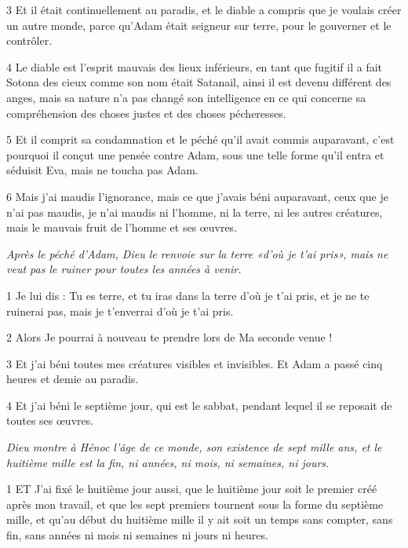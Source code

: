 \par 3 Et il était continuellement au paradis, et le diable a compris que je voulais créer un autre monde, parce qu'Adam était seigneur sur terre, pour le gouverner et le contrôler.

\par 4 Le diable est l'esprit mauvais des lieux inférieurs, en tant que fugitif il a fait Sotona des cieux comme son nom était Satanail, ainsi il est devenu différent des anges, mais sa nature n'a pas changé son intelligence en ce qui concerne sa compréhension des choses justes et des choses pécheresses.

\par 5 Et il comprit sa condamnation et le péché qu'il avait commis auparavant, c'est pourquoi il conçut une pensée contre Adam, sous une telle forme qu'il entra et séduisit Eva, mais ne toucha pas Adam.

\par 6 Mais j'ai maudis l'ignorance, mais ce que j'avais béni auparavant, ceux que je n'ai pas maudis, je n'ai maudis ni l'homme, ni la terre, ni les autres créatures, mais le mauvais fruit de l'homme et ses œuvres.


\par \textit{Après le péché d'Adam, Dieu le renvoie sur la terre «d'où je t'ai pris», mais ne veut pas le ruiner pour toutes les années à venir.}

\par 1 Je lui dis : Tu es terre, et tu iras dans la terre d'où je t'ai pris, et je ne te ruinerai pas, mais je t'enverrai d'où je t'ai pris.

\par 2 Alors Je pourrai à nouveau te prendre lors de Ma seconde venue !

\par 3 Et j'ai béni toutes mes créatures visibles et invisibles. Et Adam a passé cinq heures et demie au paradis.

\par 4 Et j'ai béni le septième jour, qui est le sabbat, pendant lequel il se reposait de toutes ses œuvres.


\par \textit{Dieu montre à Hénoc l'âge de ce monde, son existence de sept mille ans, et le huitième mille est la fin, ni années, ni mois, ni semaines, ni jours.}

\par 1 ET J'ai fixé le huitième jour aussi, que le huitième jour soit le premier créé après mon travail, et que les sept premiers tournent sous la forme du septième mille, et qu'au début du huitième mille il y ait soit un temps sans compter, sans fin, sans années ni mois ni semaines ni jours ni heures.

